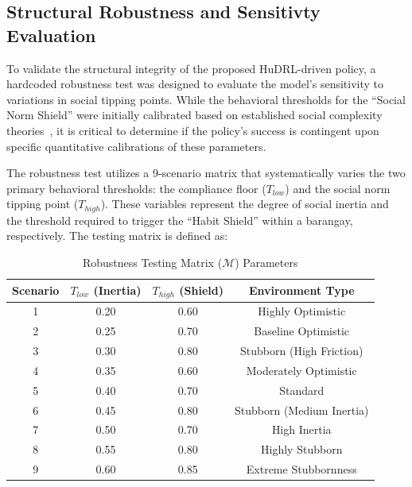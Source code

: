 \subsection{Structural Robustness and Sensitivty Evaluation}
To validate the structural integrity of the proposed HuDRL-driven policy, a hardcoded robustness test was designed to evaluate the model's sensitivity to variations in social tipping points. While the behavioral thresholds for the ``Social Norm Shield'' were initially calibrated based on established social complexity theories~\cite{Centola2018}, it is critical to determine if the policy's success is contingent upon specific quantitative calibrations of these parameters.

The robustness test utilizes a 9-scenario matrix that systematically varies the two primary behavioral thresholds: the compliance floor ($T_{low}$) and the social norm tipping point ($T_{high}$). These variables represent the degree of social inertia and the threshold required to trigger the ``Habit Shield'' within a barangay, respectively. The testing matrix is defined as:

\begin{table}[htbp]
\centering
\caption{Robustness Testing Matrix ($\mathcal{M}$) Parameters}
\label{tab:sensitivity_matrix}
\begin{tabular}{@{}cccc@{}}
\toprule
\textbf{Scenario} & \textbf{\(T_{low}\) (Inertia)} & \textbf{\(T_{high}\) (Shield)} & \textbf{Environment Type} \\ \midrule
1                 & 0.20                           & 0.60                            & Highly Optimistic         \\
2                 & 0.25                           & 0.70                            & Baseline Optimistic      \\
3                 & 0.30                           & 0.80                            & Stubborn (High Friction)  \\
4                 & 0.35                           & 0.60                            & Moderately Optimistic    \\
5                 & 0.40                           & 0.70                            & Standard                 \\
6                 & 0.45                           & 0.80                            & Stubborn (Medium Inertia)\\
7                 & 0.50                           & 0.70                            & High Inertia             \\
8                 & 0.55                           & 0.80                            & Highly Stubborn          \\
9                 & 0.60                           & 0.85                            & Extreme Stubbornness      \\ \bottomrule
\end{tabular}
\end{table}

